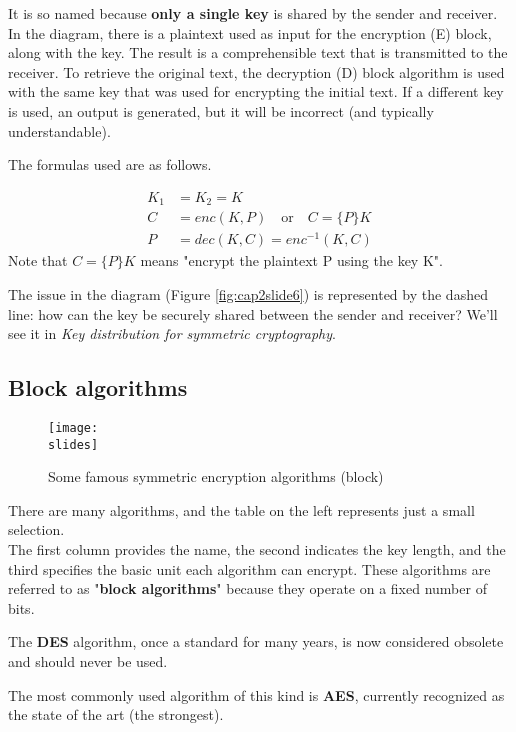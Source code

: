 It is so named because \textbf{only a single key} is shared by the sender and receiver. In the diagram, there is a plaintext used as input for the encryption (E) block, along with the key. The result is a comprehensible text that is transmitted to the receiver. To retrieve the original text, the decryption (D) block algorithm is used with the same key that was used for encrypting the initial text. If a different key is used, an output is generated, but it will be incorrect (and typically understandable).

The formulas used are as follows.

\begin{align*}
    K_1 & = K_2 = K                                    \\
    C   & = enc(K,P) \quad \text{or} \quad C = \{P\} K \\
    P   & = dec(K,C) = enc^{-1} (K,C)
\end{align*}
Note that $C = \{P\} K$ means "encrypt the plaintext P using the key K".


The issue in the diagram (Figure \ref{fig:cap2slide6}) is represented by the dashed line: how can the key be securely shared between the sender and receiver?
We'll see it in \textit{Key distribution for symmetric cryptography}.


\subsection{Block algorithms}
\begin{figure}[h]
    \centering
    \texttt{[image: \\slides]}
    \caption{Some famous symmetric encryption algorithms (block)}
\end{figure}

There are many algorithms, and the table on the left represents just a small selection. \\
The first column provides the name, the second indicates the key length, and the third specifies the basic unit each algorithm can encrypt. These algorithms are referred to as "\textbf{block algorithms}" because they operate on a fixed number of bits.

The \textbf{DES} algorithm, once a standard for many years, is now considered obsolete and should never be used.

The most commonly used algorithm of this kind is \textbf{AES}, currently recognized as the state of the art (the strongest).


